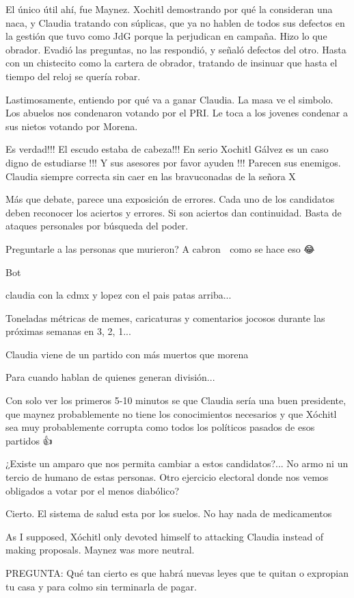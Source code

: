El único útil ahí, fue Maynez. Xochitl demostrando por qué la consideran una naca, y Claudia tratando con súplicas, que ya no hablen de todos sus defectos en la gestión que tuvo como JdG porque la perjudican en campaña. Hizo lo que obrador. Evadió las preguntas, no las respondió, y señaló defectos del otro. Hasta con un chistecito como la cartera de obrador, tratando de insinuar que hasta el tiempo del reloj se quería robar.

Lastimosamente, entiendo por qué va a ganar Claudia. La masa ve el simbolo. Los abuelos nos condenaron votando por el PRI. Le toca a los jovenes condenar a sus nietos votando por Morena.

Es verdad!!! El escudo estaba de cabeza!!! En serio Xochitl Gálvez es un caso digno de estudiarse !!! Y sus asesores por favor ayuden !!! Parecen sus enemigos. Claudia siempre correcta sin caer en las bravuconadas de la señora X

Más que debate, parece una exposición de errores. Cada uno de los candidatos deben reconocer los aciertos y errores.  Si son aciertos dan continuidad. Basta de ataques personales por búsqueda del poder.

Preguntarle a las personas que murieron? A cabron 🤣 como se hace eso 😂

Bot

claudia con la cdmx y lopez con el pais patas arriba...

Toneladas métricas de memes, caricaturas y comentarios jocosos durante las próximas semanas en 3, 2, 1...

Claudia viene de un partido con más muertos que morena

Para cuando hablan de quienes generan división...

Con solo ver los primeros 5-10 minutos se que Claudia sería una buen presidente, que maynez probablemente no tiene los conocimientos necesarios y que Xóchitl sea muy probablemente corrupta como todos los políticos pasados de esos partidos 👍

¿Existe un amparo que nos permita cambiar a estos candidatos?... No armo ni un tercio de humano de estas personas. Otro ejercicio electoral donde nos vemos obligados a votar por el menos diabólico?

Cierto. El sistema de salud esta por los suelos. No hay nada de medicamentos

As I supposed, Xóchitl only devoted himself to attacking Claudia instead of making proposals. Maynez was more neutral.

PREGUNTA: Qué tan cierto es que habrá nuevas leyes que te quitan o expropian tu casa y para colmo sin terminarla de pagar.

